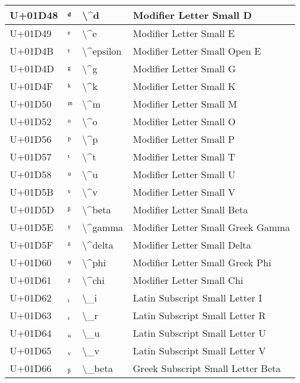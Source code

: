 \begin{table}[h]
\begin{tabulary}{\linewidth}{|L|L|L|L|}
\hline
U+01D48 & ᵈ & {\textbackslash}{\textasciicircum}d & Modifier Letter Small D \\
\hline
U+01D49 & ᵉ & {\textbackslash}{\textasciicircum}e & Modifier Letter Small E \\
\hline
U+01D4B & ᵋ & {\textbackslash}{\textasciicircum}epsilon & Modifier Letter Small Open E \\
\hline
U+01D4D & ᵍ & {\textbackslash}{\textasciicircum}g & Modifier Letter Small G \\
\hline
U+01D4F & ᵏ & {\textbackslash}{\textasciicircum}k & Modifier Letter Small K \\
\hline
U+01D50 & ᵐ & {\textbackslash}{\textasciicircum}m & Modifier Letter Small M \\
\hline
U+01D52 & ᵒ & {\textbackslash}{\textasciicircum}o & Modifier Letter Small O \\
\hline
U+01D56 & ᵖ & {\textbackslash}{\textasciicircum}p & Modifier Letter Small P \\
\hline
U+01D57 & ᵗ & {\textbackslash}{\textasciicircum}t & Modifier Letter Small T \\
\hline
U+01D58 & ᵘ & {\textbackslash}{\textasciicircum}u & Modifier Letter Small U \\
\hline
U+01D5B & ᵛ & {\textbackslash}{\textasciicircum}v & Modifier Letter Small V \\
\hline
U+01D5D & ᵝ & {\textbackslash}{\textasciicircum}beta & Modifier Letter Small Beta \\
\hline
U+01D5E & ᵞ & {\textbackslash}{\textasciicircum}gamma & Modifier Letter Small Greek Gamma \\
\hline
U+01D5F & ᵟ & {\textbackslash}{\textasciicircum}delta & Modifier Letter Small Delta \\
\hline
U+01D60 & ᵠ & {\textbackslash}{\textasciicircum}phi & Modifier Letter Small Greek Phi \\
\hline
U+01D61 & ᵡ & {\textbackslash}{\textasciicircum}chi & Modifier Letter Small Chi \\
\hline
U+01D62 & ᵢ & {\textbackslash}\_i & Latin Subscript Small Letter I \\
\hline
U+01D63 & ᵣ & {\textbackslash}\_r & Latin Subscript Small Letter R \\
\hline
U+01D64 & ᵤ & {\textbackslash}\_u & Latin Subscript Small Letter U \\
\hline
U+01D65 & ᵥ & {\textbackslash}\_v & Latin Subscript Small Letter V \\
\hline
U+01D66 & ᵦ & {\textbackslash}\_beta & Greek Subscript Small Letter Beta \\

\end{tabulary}
\end{table}
